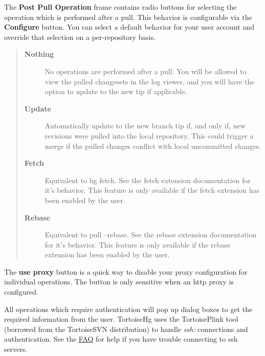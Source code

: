 \documentclass[letterpaper,10pt,english]{manual}
\begin{document}
The \textbf{Post Pull Operation} frame contains radio buttons for
selecting the operation which is performed after a pull.  This behavior
is configurable via the \textbf{Configure} button.  You can select a
default behavior for your user account and override that selection on a
per-repository basis.
\begin{quote}
\begin{description}
\item[\textbf{Nothing}]
No operations are performed after a pull.  You will be allowed to
view the pulled changesets in the log viewer, and you will have the
option to update to the new tip if applicable.

\item[\textbf{Update}]
Automatically update to the new branch tip if, and only if, new
revisions were pulled into the local repository.  This could trigger
a merge if the pulled changes conflict with local uncommitted
changes.

\item[\textbf{Fetch}]
Equivalent to hg fetch.  See the fetch extension documentation for
it's behavior.  This feature is only available if the fetch
extension has been enabled by the user.

\item[\textbf{Rebase}]
Equivalent to pull --rebase.  See the rebase extension
documentation for it's behavior.  This feature is only available
if the rebase extension has been enabled by the user.

\end{description}
\end{quote}

The \textbf{use proxy} button is a quick way to disable your proxy
configuration for individual operations. The button is only sensitive
when an http proxy is configured.

All operations which require authentication will pop up dialog boxes to
get the required information from the user.  TortoiseHg uses the
TortoisePlink tool (borrowed from the TortoiseSVN distribution) to
handle \emph{ssh:} connections and authentication.  See the \href{http://bitbucket.org/tortoisehg/stable/wiki/FAQ\#tortoisehg-faq}{FAQ} for help if
you have trouble connecting to ssh servers.
\end{document}
